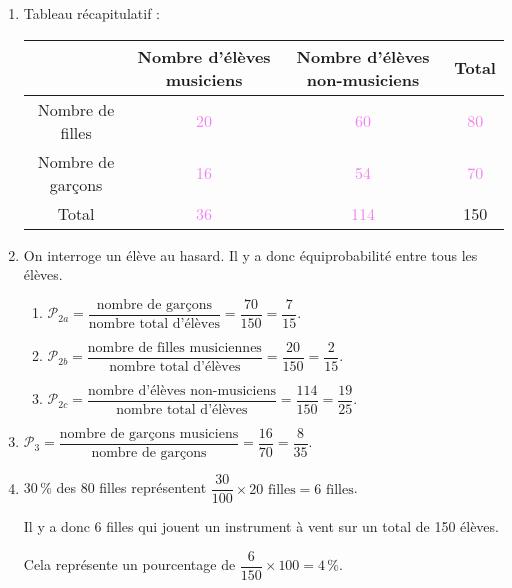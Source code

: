 
\begin{enumerate}
    \item Tableau récapitulatif :
       \begin{center}
          {
          \begin{tabular}{|C{3}|C{3}|C{3}|C{3}|}
             \hline
             & Nombre d'élèves musiciens & Nombre d'élèves non-musiciens & Total \\
             \hline
             Nombre de filles & \textcolor{violet}{20} & \textcolor{violet}{60} & \textcolor{violet}{80} \\
             \hline
             Nombre de garçons & \textcolor{violet}{16} & \textcolor{violet}{54} & \textcolor{violet}{70} \\
             \hline
             Total & \textcolor{violet}{36} & \textcolor{violet}{114} & 150 \\
             \hline
          \end{tabular}}
       \end{center}
    \item On interroge un élève au hasard. Il y a donc équiprobabilité entre tous les élèves.
       \begin{enumerate}
          \item $\mathcal{P}_{2a} =\dfrac{\text{nombre de garçons}}{\text{nombre total d'élèves}} =\dfrac{70}{150} =\dfrac{7}{15}$. \par
          \item $\mathcal{P}_{2b} =\dfrac{\text{nombre de filles musiciennes}}{\text{nombre total d'élèves}} =\dfrac{20}{150} =\dfrac{2}{15}$. \par
          \item $\mathcal{P}_{2c} =\dfrac{\text{nombre d'élèves non-musiciens}}{\text{nombre total d'élèves}} =\dfrac{114}{150} =\dfrac{19}{25}$. \par
       \end{enumerate}
    \item $\mathcal{P}_3 =\dfrac{\text{nombre de garçons musiciens}}{\text{nombre de garçons}} =\dfrac{16}{70} =\dfrac{8}{35}$. \par
    \item 30\,\% des 80 filles représentent $\dfrac{30}{100}\times20\text{ filles} =6\text{ filles}$. \par
       Il y a donc 6 filles qui jouent un instrument à vent sur un total de 150 élèves. \par
       Cela représente un pourcentage de $\dfrac{6}{150}\times100 =4\,\%$. \par
 \end{enumerate}